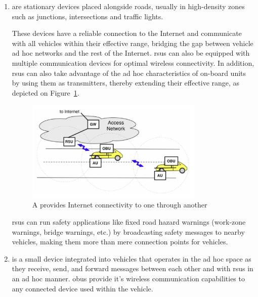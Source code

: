 \begin{enumerate}
	\item {} are stationary devices placed alongside roads, usually in high-density zones such as junctions, intersections and traffic lights.

    These devices have a reliable connection to the Internet and communicate with all vehicles within their effective range, bridging the gap between vehicle ad hoc networks and the rest of the Internet. \glspl{rsu} can also be equipped with multiple communication devices for optimal wireless connectivity. In addition, \glspl{rsu} can also take advantage of the ad hoc characteristics of on-board units by using them as transmitters, thereby extending their effective range, as depicted on Figure~\ref{fig:RSU_range}.

    \begin{figure}[htbp]
    	\centering
    	\includegraphics[width=0.8\textwidth]{Chapters/Figures/VANETs/c2c-cc_RSU_range.png}
    	\caption{A  provides Internet connectivity to one  through another ~\cite{c2c-cc_car_2007}}
    	\label{fig:RSU_range}
    \end{figure}

    \glspl{rsu} can run safety applications like fixed road hazard warnings (work-zone warnings, bridge warnings, etc.) by broadcasting safety messages to nearby vehicles, making them more than mere connection points for vehicles.
    
	\item {} is a small device integrated into vehicles that operates in the ad hoc space as they receive, send, and forward messages between each other and with \glspl{rsu} in an ad hoc manner. \glspl{obu} provide it's wireless communication capabilities to any connected device used within the vehicle.
 

\end{enumerate}
